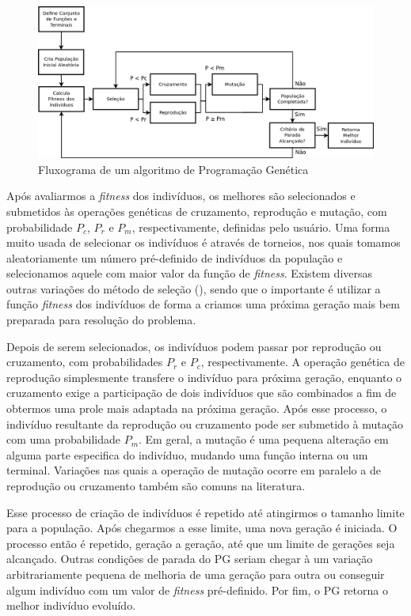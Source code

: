 \begin{figure}[t]
\centering
\includegraphics[width=1.1\textwidth]{figures/gpwf_new.png}
\caption{Fluxograma de um algoritmo de Programação Genética}
\label{fig::gpwf}
\end{figure}

Após avaliarmos a \textit{fitness} dos indivíduos, os melhores são selecionados e submetidos às operações genéticas de cruzamento, reprodução e mutação, com probabilidade $P_c$, $P_r$ e $P_m$, respectivamente, definidas pelo usuário.
Uma forma muito usada de selecionar os indivíduos é através de torneios, nos quais tomamos aleatoriamente um número pré-definido de indivíduos da população e selecionamos aquele com maior valor da função de \textit{fitness}. Existem diversas outras variações do método de seleção (\cite{Koza92}), sendo que o importante é utilizar a função \textit{fitness} dos indivíduos de forma a criamos uma próxima geração mais bem preparada para resolução do problema. 

Depois de serem selecionados, os indivíduos podem passar por reprodução ou cruzamento, com probabilidades $P_r$ e $P_c$, respectivamente. 
A operação genética de reprodução simplesmente transfere o indivíduo para próxima geração, enquanto o cruzamento exige a participação de dois indivíduos que são combinados a fim de obtermos
uma prole mais adaptada na próxima geração.
Após esse processo, o indivíduo resultante da reprodução ou cruzamento pode ser submetido à mutação com uma probabilidade $P_m$.
Em geral, a mutação é uma pequena alteração em alguma parte especifica do indivíduo, mudando uma função interna ou um terminal.
Variações nas quais a operação de mutação ocorre em paralelo a de reprodução ou cruzamento também são comuns na literatura.

Esse processo de criação de indivíduos é repetido até atingirmos o tamanho limite para a população. Após chegarmos a esse limite, uma nova geração é iniciada. 
O processo então é repetido, geração a geração, até que um limite de gerações seja alcançado. 
Outras condições de parada do \textsc{PG} seriam chegar à um variação arbitrariamente pequena de melhoria de uma geração para outra ou conseguir algum indivíduo com um valor de \textit{fitness} pré-definido. Por fim, o \textsc{PG} retorna o melhor indivíduo evoluído.

